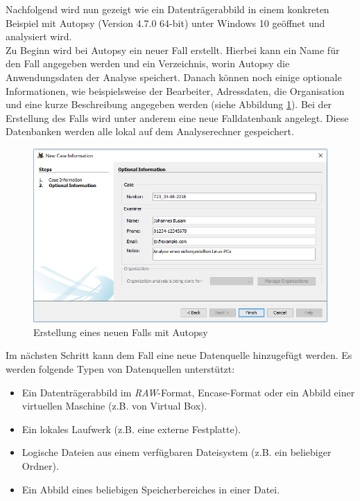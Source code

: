 \noindent
Nachfolgend wird nun gezeigt wie ein Datenträgerabbild in einem konkreten Beispiel mit Autopsy (Version 4.7.0 64-bit) unter Windows 10 geöffnet und analysiert wird.\\
Zu Beginn wird bei Autopsy ein neuer Fall erstellt. Hierbei kann ein Name für den Fall angegeben werden und ein Verzeichnis, worin Autopsy die Anwendungsdaten der Analyse speichert. Danach können noch einige optionale Informationen, wie beispielsweise der Bearbeiter, Adressdaten, die Organisation und eine kurze Beschreibung angegeben werden (siehe Abbildung \ref{fig:autopsy_1_case_information}). Bei der Erstellung des Falls wird unter anderem eine neue Falldatenbank angelegt. Diese Datenbanken werden alle lokal auf dem Analyserechner gespeichert.\\

\begin{figure}[ht]
  \centering
  \includegraphics[width=\textwidth]{./resource/autopsy_1_case_information.png}
  \caption{Erstellung eines neuen Falls mit Autopsy}
  \label{fig:autopsy_1_case_information}
\end{figure}

\noindent
Im nächsten Schritt kann dem Fall eine neue Datenquelle hinzugefügt werden. Es werden folgende Typen von Datenquellen unterstützt:
\begin{itemize}
\item Ein Datenträgerabbild im \textit{RAW}-Format, Encase-Format oder ein Abbild einer virtuellen Maschine (z.B. von Virtual Box).
\item Ein lokales Laufwerk (z.B. eine externe Festplatte).
\item Logische Dateien aus einem verfügbaren Dateisystem (z.B. ein beliebiger Ordner).
\item Ein Abbild eines beliebigen Speicherbereiches in einer Datei.
\end{itemize}

